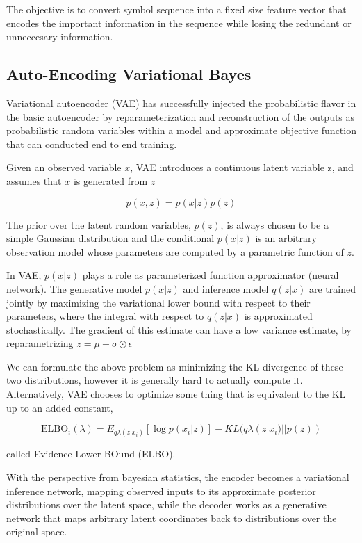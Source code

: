 \documentclass{article}
\begin{document}
The objective is to convert symbol sequence into a fixed size feature vector that encodes the important information in the sequence while losing the redundant or unneccesary information.

\subsection{Auto-Encoding Variational Bayes}

Variational autoencoder (VAE) \cite{vae} has successfully injected the probabilistic flavor in the basic autoencoder by reparameterization and reconstruction of the outputs as probabilistic random variables within a model and approximate objective function that can conducted end to end training.

Given an observed variable $x$, VAE introduces a continuous latent variable z, and assumes that $x$ is generated from $z$

$$p(x,z) = p(x|z)p(z)$$

The prior over the latent random variables, $p(z)$, is always chosen to be a simple Gaussian distribution and the conditional $p(x|z)$ is an arbitrary observation model whose parameters are computed by a parametric function of $z$. 

In VAE, $p(x|z)$ plays a role as parameterized function approximator (neural network). The generative model $p(x|z)$ and inference model $q(z|x)$ are trained jointly by maximizing the variational lower bound with respect to their parameters, where the integral with respect to $q(z|x)$ is approximated stochastically. The gradient of this estimate can have a low variance estimate, by reparametrizing $z = \mu+\sigma\odot\epsilon$

We can formulate the above problem as minimizing the KL divergence of these two distributions, however it is generally hard to actually compute it. Alternatively, VAE chooses to optimize some thing that is equivalent to the KL up to an added constant,

$$\text{ELBO}_i (\lambda) = E_{q\lambda (z|x_i)}[\log p(x_i|z)]-KL(q\lambda (z|x_i)||p(z))$$ 

called Evidence Lower BOund (ELBO).

With the perspective from bayesian statistics, the encoder becomes a variational inference network, mapping observed inputs to its approximate posterior distributions over the latent space, while the decoder works as a generative network that maps arbitrary latent coordinates back to distributions over the original space.
\end{document}
